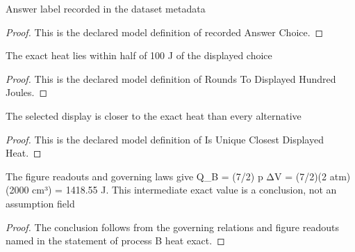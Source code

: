 \begin{definition}
  \label{def:physics:phyx-mini-0409:phyxminiproblems-problemphyxmini0409-recordedanswerchoice}
  Answer label recorded in the dataset metadata
\end{definition}
\begin{proof}
  This is the declared model definition of recorded Answer Choice.
\end{proof}
\begin{definition}
  \label{def:physics:phyx-mini-0409:phyxminiproblems-problemphyxmini0409-roundstodisplayedhundredjoules}
  The exact heat lies within half of 100 J of the displayed choice
\end{definition}
\begin{proof}
  This is the declared model definition of Rounds To Displayed Hundred Joules.
\end{proof}
\begin{definition}
  \label{def:physics:phyx-mini-0409:phyxminiproblems-problemphyxmini0409-isuniqueclosestdisplayedheat}
  The selected display is closer to the exact heat than every alternative
\end{definition}
\begin{proof}
  This is the declared model definition of Is Unique Closest Displayed Heat.
\end{proof}
\begin{lemma}
  \label{lem:physics:phyx-mini-0409:phyxminiproblems-problemphyxmini0409-processb-heat-exact}
  The figure readouts and governing laws give Q\_B = (7/2) p ΔV = (7/2)(2 atm)(2000 cm³) = 1418.55 J. This intermediate exact value is a conclusion, not an assumption field
\end{lemma}
\begin{proof}
  The conclusion follows from the governing relations and figure readouts named in the statement of process B heat exact.
\end{proof}
